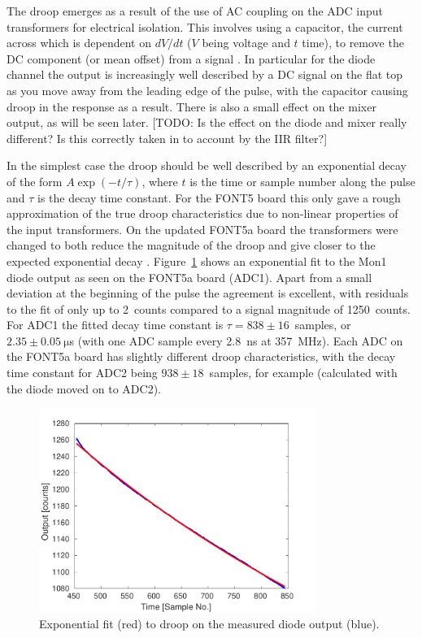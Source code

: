 The droop emerges as a result of the use of AC coupling on the ADC input transformers for electrical isolation. This involves using a capacitor, the current across which is dependent on \({dV}/{dt}\) (\(V\) being voltage and \(t\) time), to remove the DC component (or mean offset) from a signal \cite{acCoupling}. In particular for the diode channel the output is increasingly well described by a DC signal on the flat top as you move away from the leading edge of the pulse, with the capacitor causing droop in the response as a result. There is also a small effect on the mixer output, as will be seen later. [TODO: Is the effect on the diode and mixer really different? Is this correctly taken in to account by the IIR filter?]

In the simplest case the droop should be well described by an exponential decay of the form \(A\exp\left(-t/\tau\right)\), where \(t\) is the time or sample number along the pulse and \(\tau\) is the decay time constant. For the FONT5 board this only gave a rough approximation of the true droop characteristics due to non-linear properties of the input transformers. On the updated FONT5a board the transformers were changed to both reduce the magnitude of the droop and give closer to the expected exponential decay \cite{colinPriv}. Figure~\ref{f:iirDiodeFit} shows an exponential fit to the Mon1 diode output as seen on the FONT5a board (ADC1). Apart from a small deviation at the beginning of the pulse the agreement is excellent, with residuals to the fit of only up to 2~counts compared to a signal magnitude of 1250~counts. For ADC1 the fitted decay time constant is \(\tau = 838\pm16\)~samples, or \(2.35\pm0.05~\mathrm{\mu}\)s (with one ADC sample every 2.8~ns at 357~MHz). Each ADC on the FONT5a board has slightly different droop characteristics, with the decay time constant for ADC2 being \(938\pm18\)~samples, for example (calculated with the diode moved on to ADC2).

\begin{figure}
  \centering
  \includegraphics[width=0.8\textwidth]{Figures/commissioning/iirDiodeFit}
  \caption{Exponential fit (red) to droop on the measured diode output (blue).}
  \label{f:iirDiodeFit}
\end{figure}

